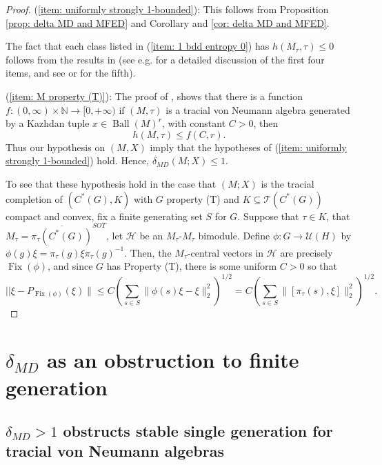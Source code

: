 \documentclass[10pt]{amsart}
\theoremstyle{definition}
\numberwithin{equation}{section}
\newcommand{\bN}{{\mathbb N}}
\newcommand{\cH}{{\mathcal H}}
\newcommand{\cT}{{\mathcal T}}
\newcommand{\cU}{{\mathcal U}}
\DeclareMathOperator{\Ball}{Ball}
\DeclareMathOperator{\Fix}{Fix}
\begin{document}
\begin{proof}


(\ref{item: uniformly strongly 1-bounded}): This follows from  Proposition \ref{prop: delta MD and MFED} and Corollary and \ref{cor: delta MD and MFED}.



The fact that each class listed in (\ref{item: 1 bdd entropy 0}) has $h(M_{\tau},\tau)\leq 0$ follows from the results in \cite{Jung2007, Hayes2018} (see e.g. \cite[Section 1.2]{FreePinsker} for a detailed discussion of the first four items, and see \cite[Corollary 4.8]{Hayes2018} or \cite[Fact 2.9]{SeqCommutation} for the fifth).

(\ref{item: M property (T)}): The proof of \cite[Theorem 1.1]{HJKEPropT}, shows that there is a function $f\colon (0,\infty)\times \bN\to [0,+\infty)$ if $(M,\tau)$ is a tracial von Neumann algebra generated by a Kazhdan tuple $x\in \Ball(M)^{r}$, with constant $C>0$, then 
\[h(M,\tau)\leq f(C,r).\]
Thus our hypothesis on $(M,X)$ imply that the hypotheses of (\ref{item: uniformly strongly 1-bounded}) hold. Hence, $\delta_{MD}(M;X)\leq 1$. 

To see that these hypothesis hold in the case that $(M;X)$ is the tracial completion of $(C^{*}(G),K)$ with $G$ property (T) and $K\subseteq \cT(C^{*}(G))$ compact and convex, fix a finite generating set $S$ for $G$. Suppose that $\tau\in K$, that $M_{\tau}=\overline{\pi_{\tau}(C^{*}(G))}^{SOT}$, let $\cH$ be an $M_{\tau}$-$M_{\tau}$ bimodule. Define $\phi\colon G\to \cU(H)$ by $\phi(g)\xi=\pi_{\tau}(g)\xi\pi_{\tau}(g)^{-1}$. Then, the $M_{\tau}$-central vectors in $\cH$ are precisely $\Fix(\phi)$, and since $G$ has Property (T), there is some uniform $C>0$ so that 
\[||\xi-P_{\Fix(\phi)}(\xi)\|\leq C\left(\sum_{s\in S}\|\phi(s)\xi-\xi\|_{2}^{2}\right)^{1/2}=C\left(\sum_{s\in S}\|[\pi_{\tau}(s),\xi]\|_{2}^{2}\right)^{1/2}.\]

    
\end{proof}

\section{$\delta_{MD}$ as an obstruction to finite generation}

\subsection{$\delta_{MD}>1$ obstructs stable single generation for tracial von Neumann algebras}
\end{document}
